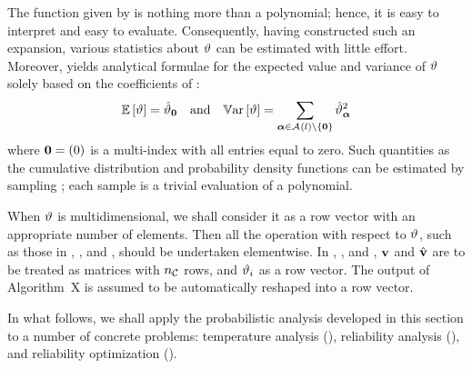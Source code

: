 The function given by  is nothing more than a polynomial; hence, it is easy to interpret and easy to evaluate.
Consequently, having constructed such an expansion, various statistics about $\vartheta$ can be estimated with little effort.
Moreover,  yields analytical formulae for the expected value and variance of $\vartheta$ solely based on the coefficients of :
\begin{equation} \elab{probabilistic-moments}
  \expectation{\w} = \coefficient{\w}_\vZero \hspace{1em} \text{and} \hspace{1em} \variance{\w} = \sum_{\multiindex \in \multiindexSet{\level} \setminus \{ \vZero \}} \coefficient{\w}_{\multiindex}^2
\end{equation}
where $\mathbf{0} = (0)$ is a multi-index with all entries equal to zero.
Such quantities as the cumulative distribution and probability density functions can be estimated by sampling ; each sample is a trivial evaluation of a polynomial.

\begin{remark} 
When $\vartheta$ is multidimensional, we shall consider it as a row vector with an appropriate number of elements.
Then all the operation with respect to $\vartheta$, such as those in , , and , should be undertaken elementwise.
In , , and , $\mathbf{v}$ and $\hat{\mathbf{v}}$ are to be treated as matrices with ${n_\mathcal{C}}$ rows, and $\vartheta_i$ as a row vector.
The output of Algorithm~X is assumed to be automatically reshaped into a row vector.
\end{remark}

In what follows, we shall apply the probabilistic analysis developed in this section to a number of concrete problems: temperature analysis (), reliability analysis (), and reliability optimization ().
